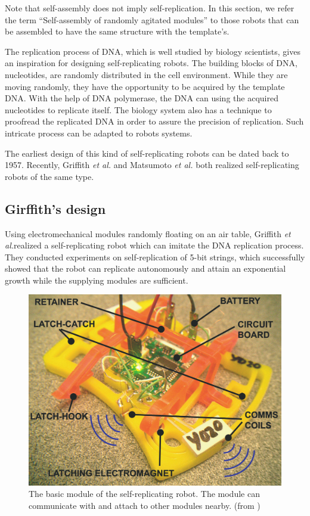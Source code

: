 \documentclass[12pt,twoside]{article}
\theoremstyle{plain}
\theoremstyle{definition}
\theoremstyle{remark}
\newcommand{\etal}{\textit{et al.}}
\begin{document}
Note that self-assembly does not imply self-replication. In this section, we refer the term ``Self-assembly of randomly agitated modules'' to those robots that can be assembled to have the same structure with the template's. 

The replication process of DNA, which is well studied by biology scientists, gives an inspiration for designing self-replicating robots. The building blocks of DNA, nucleotides, are randomly distributed in the cell environment. While they are moving randomly, they have the opportunity to be acquired by the template DNA. With the help of DNA polymerase, the DNA can using the acquired nucleotides to replicate itself. The biology system also has a technique to proofread the replicated DNA in order to assure the precision of replication\cite{alberts_molecular_2002}. Such intricate process can be adapted to robots systems.

The earliest design of this kind of self-replicating robots can be dated back to 1957\cite{penrose_self-reproducing_1957}. Recently, Griffith \etal \cite{griffith_self-replication_2005} and Matsumoto \etal \cite{matsumoto_passive_2009} both realized self-replicating robots of the same type.

\subsection{Girffith's design}
Using electromechanical modules randomly floating on an air table, Griffith \etal realized a self-replicating robot which can imitate the DNA replication process\cite{griffith_growing_2004}\cite{griffith_self-replication_2005}. They conducted experiments on self-replication of 5-bit strings, which successfully showed that the robot can replicate autonomously and attain an exponential growth while the supplying modules are sufficient.

\begin{figure}[t]
	 \centerline{\includegraphics[width=.4\textwidth]{griffith-000}}
	 {\caption{The basic module of the self-replicating robot. The module can communicate with and attach to other modules nearby. (from \cite{griffith_growing_2004})}
	 \label{fig:gri-unit}}
\end{figure}
\end{document}
